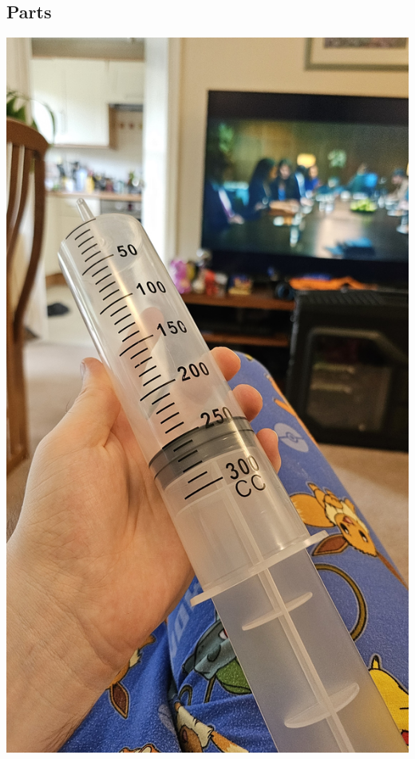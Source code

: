 \documentclass[11pt,a4paper,titlepage]{report}
\begin{document}
	\subsection{Parts}\label{appendix:images_parts}
	\begin{center}
		\label{picture:images_parts_1}
		\includegraphics[width=\linewidth]{assets/Syringe1.jpg}
	\end{center}
\end{document}
